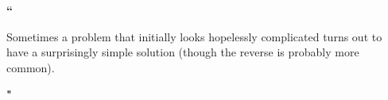 \documentclass[a4paper,12pt,oneside,openright]{report}
\begin{document}
\onehalfspacing


\vspace{4cm}
\begin{center}
{\Huge \noindent \textbf{\textcolor{sections}{``}}}\\
\vspace{0.6cm}



{\huge Sometimes a problem that initially looks hopelessly complicated turns out to have a surprisingly simple solution (though the reverse is probably more common).} %


{\vspace{0.8cm}\Huge \noindent \textbf{\textcolor{sections}{"}}}\\

\end{center}
\end{document}
